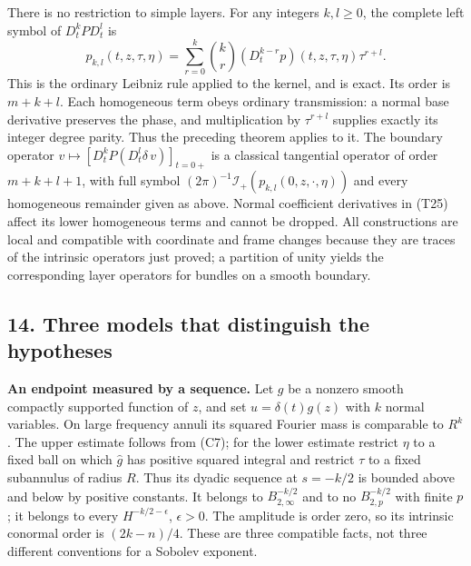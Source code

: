 \documentclass[
  11pt,
]{article}
\makeatletter
\let\ReaderOriginalAnchorStart\hyper@anchorstart
\let\ReaderOriginalAnchorEnd\hyper@anchorend
\let\ReaderPendingAliases\@empty
\def\ReaderArmAliases#1{\gdef\ReaderPendingAliases{#1}}
\def\hyper@anchorstart#1{\ReaderIfNativeAnchorTF{#1}{\ReaderPendingAliases\global\let\ReaderPendingAliases\@empty}{}\ReaderOriginalAnchorStart{#1}}
\makeatother
\begin{document}
There is no restriction to simple layers. For any integers \(k,l\geq0\),
the complete left symbol of \(D_t^kPD_t^l\) is \[
p_{k,l}(t,z,\tau,\eta)=
\sum_{r=0}^k\binom{k}{r}
(D_t^{k-r}p)(t,z,\tau,\eta)\tau^{r+l}.
\tag{T25}
\] This is the ordinary Leibniz rule applied to the kernel, and is
exact. Its order is \(m+k+l\). Each homogeneous term obeys ordinary
transmission: a normal base derivative preserves the phase, and
multiplication by \(\tau^{r+l}\) supplies exactly its integer degree
parity. Thus the preceding theorem applies to it. The boundary operator
\(v\mapsto[D_t^kP(D_t^l\delta\,v)]_{t=0+}\) is a classical tangential
operator of order \(m+k+l+1\), with full symbol
\((2\pi)^{-1}\mathcal I_+(p_{k,l}(0,z,\cdot,\eta))\) and every
homogeneous remainder given as above. Normal coefficient derivatives in
(T25) affect its lower homogeneous terms and cannot be dropped. All
constructions are local and compatible with coordinate and frame changes
because they are traces of the intrinsic operators just proved; a
partition of unity yields the corresponding layer operators for bundles
on a smooth boundary.

\ReaderArmAliases{\ReaderOriginalAnchorStart{AN03-CEX-001}\ReaderOriginalAnchorEnd\begingroup\expandafter\def\csname @currentHref\endcsname{AN03-CEX-001}\label{AN03-CEX-001}\endgroup\ReaderOriginalAnchorStart{an03-cex-001-three-models-that-distinguish-the-hypotheses}\ReaderOriginalAnchorEnd\begingroup\expandafter\def\csname @currentHref\endcsname{an03-cex-001-three-models-that-distinguish-the-hypotheses}\label{an03-cex-001-three-models-that-distinguish-the-hypotheses}\endgroup\ReaderOriginalAnchorStart{14-three-models-that-distinguish-the-hypotheses}\ReaderOriginalAnchorEnd\begingroup\expandafter\def\csname @currentHref\endcsname{14-three-models-that-distinguish-the-hypotheses}\label{14-three-models-that-distinguish-the-hypotheses}\endgroup\ReaderOriginalAnchorStart{three-models-that-distinguish-the-hypotheses}\ReaderOriginalAnchorEnd}
\subsection{14. Three models that distinguish the
hypotheses}\label{three-models-that-distinguish-the-hypotheses}

\textbf{An endpoint measured by a sequence.} Let \(g\) be a nonzero
smooth compactly supported function of \(z\), and set
\(u=\delta(t)g(z)\) with \(k\) normal variables. On large frequency
annuli its squared Fourier mass is comparable to \(R^k\). The upper
estimate follows from (C7); for the lower estimate restrict \(\eta\) to
a fixed ball on which \(\widehat g\) has positive squared integral and
restrict \(\tau\) to a fixed subannulus of radius \(R\). Thus its dyadic
sequence at \(s=-k/2\) is bounded above and below by positive constants.
It belongs to \(B^{-k/2}_{2,\infty}\) and to no \(B^{-k/2}_{2,p}\) with
finite \(p\); it belongs to every \(H^{-k/2-\epsilon}\), \(\epsilon>0\).
The amplitude is order zero, so its intrinsic conormal order is
\((2k-n)/4\). These are three compatible facts, not three different
conventions for a Sobolev exponent.
\end{document}
